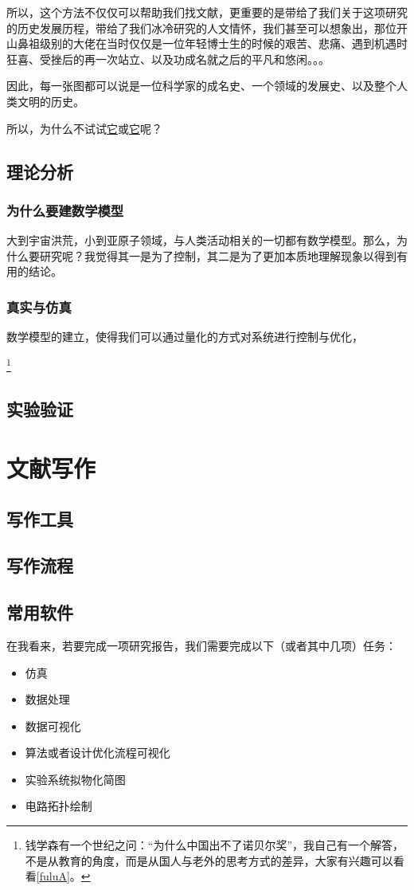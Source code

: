 \documentclass[UTF8,oneside]{ctexbook}
\begin{document}
所以，这个方法不仅仅可以帮助我们找文献，更重要的是带给了我们关于这项研究的历史发展历程，带给了我们冰冷研究的人文情怀，我们甚至可以想象出，那位开山鼻祖级别的大佬在当时仅仅是一位年轻博士生的时候的艰苦、悲痛、遇到机遇时狂喜、受挫后的再一次站立、以及功成名就之后的平凡和悠闲。。。

因此，每一张图都可以说是一位科学家的成名史、一个领域的发展史、以及整个人类文明的历史。

所以，为什么不试试\href{https://zhuanlan.zhihu.com/p/20902898}{它}或\href{https://zhuanlan.zhihu.com/p/30970993}{它}呢？

\section{理论分析}
\subsection{为什么要建数学模型}
大到宇宙洪荒，小到亚原子领域，与人类活动相关的一切都有数学模型。那么，为什么要研究呢？我觉得其一是为了控制，其二是为了更加本质地理解现象以得到有用的结论。

\subsection{真实与仿真}
数学模型的建立，使得我们可以通过量化的方式对系统进行控制与优化，

\footnote{钱学森有一个世纪之问：“为什么中国出不了诺贝尔奖”，我自己有一个解答，不是从教育的角度，而是从国人与老外的思考方式的差异，大家有兴趣可以看看\ref{fuluA}。}

\section{实验验证}

\chapter{文献写作}
\section{写作工具}
\section{写作流程}
\section{常用软件}
在我看来，若要完成一项研究报告，我们需要完成以下（或者其中几项）任务：
\begin{itemize}
	\item 仿真
	\item 数据处理
	\item 数据可视化
	\item 算法或者设计优化流程可视化
	\item 实验系统拟物化简图
	\item 电路拓扑绘制
\end{itemize}
\end{document}
